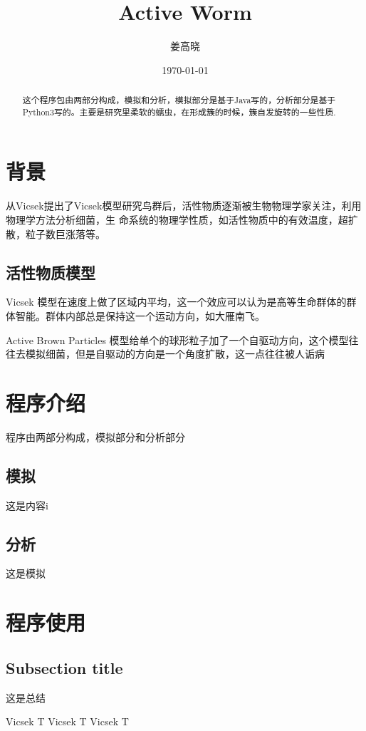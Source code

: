 \documentclass{report}
\begin{document}
\begin{CJK}{UTF8}{gkai}
\title{Active Worm}
\author{姜高晓}
\date{\today}
\maketitle
\begin{abstract}
这个程序包由两部分构成，模拟和分析，模拟部分是基于Java写的，分析部分是基于Python3写的。主要是研究里柔软的蠕虫，在形成簇的时候，簇自发旋转的一些性质.
\end{abstract}

\section{背景}
	
	从Vicsek提出了Vicsek模型研究鸟群后，活性物质逐渐被生物物理学家关注，利用物理学方法分析细菌，生
命系统的物理学性质，如活性物质中的有效温度，超扩散，粒子数巨涨落等。

\subsection{活性物质模型}

	Vicsek 模型在速度上做了区域内平均，这一个效应可以认为是高等生命群体的群体智能。群体内部总是保持这一个运动方向，如大雁南飞。

	Active Brown Particles 模型给单个的球形粒子加了一个自驱动方向，这个模型往往去模拟细菌，但是自驱动的方向是一个角度扩散，这一点往往被人诟病
\section{程序介绍}
	
	程序由两部分构成，模拟部分和分析部分

\subsection{模拟}
        这是内容i
\subsection{分析}
	这是模拟
\section{程序使用}
\subsection{Subsection title}
        这是总结




\begin{thebibliography}{12345}%
 Vicsek T
 Vicsek T
 Vicsek T


\end{thebibliography}
\end{CJK}
\end{document}
